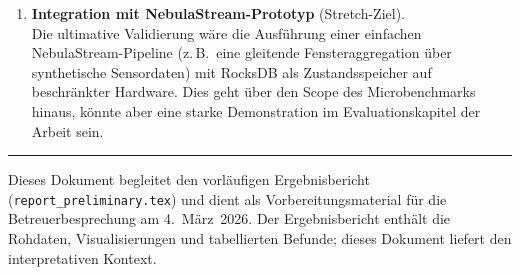 \documentclass[11pt,a4paper]{scrartcl}
\begin{document}
\begin{enumerate}
  \item \textbf{Integration mit NebulaStream-Prototyp} (Stretch-Ziel).\\
        Die ultimative Validierung wäre die Ausführung einer einfachen
        NebulaStream-Pipeline (z.\,B.\ eine gleitende Fensteraggregation über
        synthetische Sensordaten) mit RocksDB als Zustandsspeicher auf
        beschränkter Hardware. Dies geht über den Scope des Microbenchmarks
        hinaus, könnte aber eine starke Demonstration im Evaluationskapitel
        der Arbeit sein.

\end{enumerate}

\bigskip
\noindent\rule{\textwidth}{0.3pt}
\smallskip
{\small Dieses Dokument begleitet den vorläufigen Ergebnisbericht
(\texttt{report\_preliminary.tex}) und dient als Vorbereitungsmaterial für die
Betreuerbesprechung am 4.~März~2026. Der Ergebnisbericht enthält die Rohdaten,
Visualisierungen und tabellierten Befunde; dieses Dokument liefert den
interpretativen Kontext.}
\end{document}
